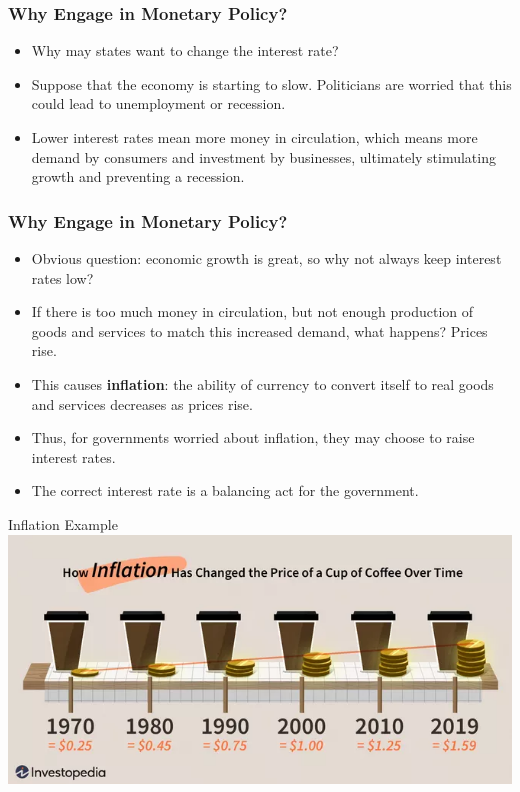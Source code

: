 \documentclass{beamer}
\begin{document}
\begin{frame} 
	\frametitle{\LARGE{Why Engage in Monetary Policy?}}
	\begin{itemize}
		\item Why may states want to change the interest rate? \pause
		\item Suppose that the economy is starting to slow. Politicians are worried that this could lead to unemployment or recession. \pause
		\item Lower interest rates mean more money in circulation, which means more demand by consumers and investment by businesses, ultimately stimulating growth and preventing a recession. \pause
	\end{itemize}
\end{frame}


\begin{frame} 
	\frametitle{\LARGE{Why Engage in Monetary Policy?}}
	\begin{itemize}
		\item Obvious question: economic growth is great, so why not always keep interest rates low? 
		\item If there is too much money in circulation, but not enough production of goods and services to match this increased demand, what happens? \pause Prices rise.
		\item This causes \textbf{inflation}: the ability of currency to convert itself to real goods and services decreases as prices rise. \pause
		\item Thus, for governments worried about inflation, they may choose to raise interest rates.	
		\item The correct interest rate is a balancing act for the government.
	\end{itemize}
\end{frame}

\begin{frame}{\LARGE Inflation Example}
	\centering
	\includegraphics[width=\textwidth,height=0.8\textheight,keepaspectratio]{coffeeinflation.png}
\end{frame}
\end{document}

